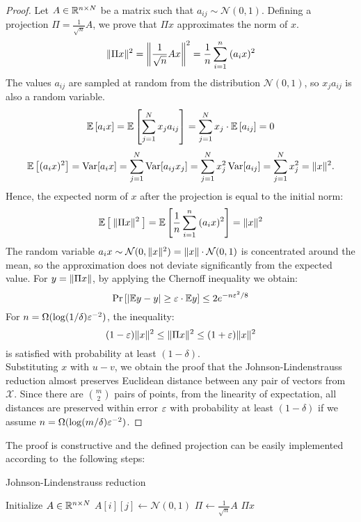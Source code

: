 \begin{proof}
Let \( A \in \mathbb{R}^{n \times N} \) be a matrix such that \( a_{ij} \sim \mathcal{N}(0,1) \). Defining a projection \( \Pi = \frac{1}{\sqrt{n}}A \), \linebreak we prove that \( \Pi x \) approximates the norm of \( x \).
\[
    \| \Pi x \|^2 = \left\|\frac{1}{\sqrt{n}}Ax\right\|^2 = \frac{1}{n} \sum_{i=1}^n\: (a_ix)^2
\]
The values \( a_{ij} \) are sampled at random from the distribution \( \mathcal{N}(0,1) \), so \( x_j a_{ij} \) is also a random variable.
\[
    \mathbb{E}\left[ a_ix \right] = \mathbb{E}\left[ \sum_{j=1}^N x_ja_{ij} \right] = \sum_{j=1}^N x_j\cdot \mathbb{E}\left[ a_{ij} \right] = 0
\]
\[
    \mathbb{E}\left[ (a_ix)^2 \right] = \operatorname{Var}[a_ix] = \sum_{j=1}^N \operatorname{Var}[a_{ij}x_j] = \sum_{j=1}^N x_j^2 \operatorname{Var}[a_{ij}] = \sum_{j=1}^N x_j^2 = \| x \|^2.
\]
Hence, the expected norm of \( x \) after the projection is equal to the initial norm:
\[
    \mathbb{E} \left[ \: \| \Pi x \|^2 \: \right] = \mathbb{E} \left[ \frac{1}{n} \sum_{i=1}^n\: (a_ix)^2 \right] = \| x \|^2
\]
The random variable \( a_ix \sim \mathcal{N}(0, \| x \|^2) = \| x \|\cdot \mathcal{N}(0, 1) \) is concentrated around the mean, so the approximation does not deviate significantly from the expected value. For \( y = \| \Pi x \| \), by applying the Chernoff inequality we obtain:
\[
    \Pr \left[ \left| \mathbb{E}y - y \right| \geq \varepsilon \cdot \mathbb{E}y \right] \leq 2 e^{-n \varepsilon^2 / 8}
\]
For \( n = \Omega(\log(1/\delta)\varepsilon^{-2}) \), the inequality:
\[
    (1-\varepsilon)\| x \|^2 \leq \| \Pi x \|^2 \leq (1+\varepsilon)\| x \|^2
\]
is satisfied with probability at least \( (1-\delta) \). \\
Substituting \( x \) with \( u-v \), we obtain the proof that the Johnson-Lindenstrauss reduction almost preserves Euclidean distance between any pair of vectors from \( \mathcal{X} \). Since there are \( {m \choose 2} \) pairs of points, from the linearity of expectation, all distances are preserved within error \( \varepsilon \) with probability at least \( (1-\delta) \) if we assume \( n = \Omega(\log(m/\delta)\varepsilon^{-2}) \).
\end{proof}
The proof is constructive and the defined projection can be easily implemented according to~the following steps:
\begin{algorithm}[H]
    \caption{Johnson-Lindenstrauss reduction}
    \label{alg:jl}
    \begin{algorithmic}[1]

        \State Initialize \( A \in \mathbb{R}^{n \times N} \)
        \State \( A[i][j] \gets \mathcal{N}(0,1) \)
        \EndFor
        \EndFor
        \State \( \Pi \gets \frac{1}{\sqrt{n}}A \)
        \State \Return \( \Pi x \)
    \end{algorithmic}
\end{algorithm}

